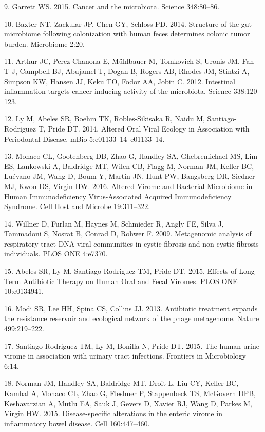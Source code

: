 \documentclass[12pt,]{article}
\begin{document}
\hypertarget{ref-Garrett:2015fg}{}
9. Garrett WS. 2015. Cancer and the microbiota. Science 348:80--86.

\hypertarget{ref-Baxter:2014hb}{}
10. Baxter NT, Zackular JP, Chen GY, Schloss PD. 2014. Structure of the
gut microbiome following colonization with human feces determines
colonic tumor burden. Microbiome 2:20.

\hypertarget{ref-Arthur:2012kl}{}
11. Arthur JC, Perez-Chanona E, Mühlbauer M, Tomkovich S, Uronis JM, Fan
T-J, Campbell BJ, Abujamel T, Dogan B, Rogers AB, Rhodes JM, Stintzi A,
Simpson KW, Hansen JJ, Keku TO, Fodor AA, Jobin C. 2012. Intestinal
inflammation targets cancer-inducing activity of the microbiota. Science
338:120--123.

\hypertarget{ref-Ly:2014ew}{}
12. Ly M, Abeles SR, Boehm TK, Robles-Sikisaka R, Naidu M,
Santiago-Rodriguez T, Pride DT. 2014. Altered Oral Viral Ecology in
Association with Periodontal Disease. mBio 5:e01133--14--e01133--14.

\hypertarget{ref-Monaco:2016ita}{}
13. Monaco CL, Gootenberg DB, Zhao G, Handley SA, Ghebremichael MS, Lim
ES, Lankowski A, Baldridge MT, Wilen CB, Flagg M, Norman JM, Keller BC,
Luévano JM, Wang D, Boum Y, Martin JN, Hunt PW, Bangsberg DR, Siedner
MJ, Kwon DS, Virgin HW. 2016. Altered Virome and Bacterial Microbiome in
Human Immunodeficiency Virus-Associated Acquired Immunodeficiency
Syndrome. Cell Host and Microbe 19:311--322.

\hypertarget{ref-Willner:2009dq}{}
14. Willner D, Furlan M, Haynes M, Schmieder R, Angly FE, Silva J,
Tammadoni S, Nosrat B, Conrad D, Rohwer F. 2009. Metagenomic analysis of
respiratory tract DNA viral communities in cystic fibrosis and
non-cystic fibrosis individuals. PLOS ONE 4:e7370.

\hypertarget{ref-Abeles:2015dy}{}
15. Abeles SR, Ly M, Santiago-Rodriguez TM, Pride DT. 2015. Effects of
Long Term Antibiotic Therapy on Human Oral and Fecal Viromes. PLOS ONE
10:e0134941.

\hypertarget{ref-Modi:2013fi}{}
16. Modi SR, Lee HH, Spina CS, Collins JJ. 2013. Antibiotic treatment
expands the resistance reservoir and ecological network of the phage
metagenome. Nature 499:219--222.

\hypertarget{ref-SantiagoRodriguez:2015gd}{}
17. Santiago-Rodriguez TM, Ly M, Bonilla N, Pride DT. 2015. The human
urine virome in association with urinary tract infections. Frontiers in
Microbiology 6:14.

\hypertarget{ref-Norman:2015kb}{}
18. Norman JM, Handley SA, Baldridge MT, Droit L, Liu CY, Keller BC,
Kambal A, Monaco CL, Zhao G, Fleshner P, Stappenbeck TS, McGovern DPB,
Keshavarzian A, Mutlu EA, Sauk J, Gevers D, Xavier RJ, Wang D, Parkes M,
Virgin HW. 2015. Disease-specific alterations in the enteric virome in
inflammatory bowel disease. Cell 160:447--460.
\end{document}
